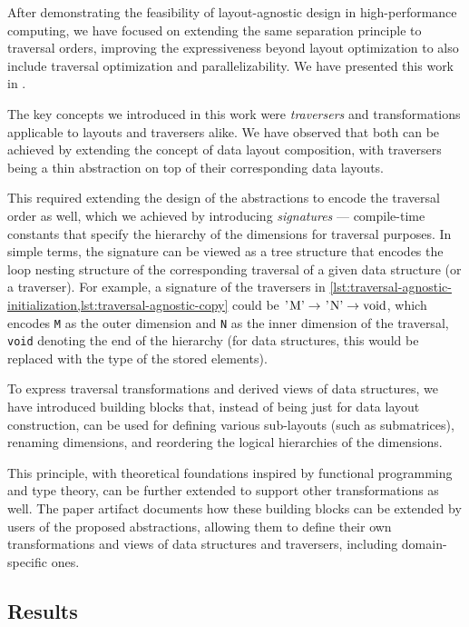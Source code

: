 After demonstrating the feasibility of layout-agnostic design in high-performance computing, we have focused on extending the same separation principle to traversal orders, improving the expressiveness beyond layout optimization to also include traversal optimization and parallelizability. We have presented this work in .

The key concepts we introduced in this work were \emph{traversers} and transformations applicable to layouts and traversers alike. We have observed that both can be achieved by extending the concept of data layout composition, with traversers being a thin abstraction on top of their corresponding data layouts.

This required extending the design of the abstractions to encode the traversal order as well, which we achieved by introducing \emph{signatures} --- compile-time constants that specify the hierarchy of the dimensions for traversal purposes. In simple terms, the signature can be viewed as a tree structure that encodes the loop nesting structure of the corresponding traversal of a given data structure (or a traverser). For example, a signature of the traversers in \cref{lst:traversal-agnostic-initialization,lst:traversal-agnostic-copy} could be $\text{\lstinline{'M'}} \to \text{\lstinline{'N'}} \to \text{\lstinline{void}}$, which encodes \lstinline{M} as the outer dimension and \lstinline{N} as the inner dimension of the traversal, \lstinline{void} denoting the end of the hierarchy (for data structures, this would be replaced with the type of the stored elements).

To express traversal transformations and derived views of data structures, we have introduced building blocks that, instead of being just for data layout construction, can be used for defining various sub-layouts (such as submatrices), renaming dimensions, and reordering the logical hierarchies of the dimensions.

This principle, with theoretical foundations inspired by functional programming and type theory, can be further extended to support other transformations as well. The paper artifact documents how these building blocks can be extended by users of the proposed abstractions, allowing them to define their own transformations and views of data structures and traversers, including domain-specific ones.


\subsection{Results}\label{sec:traversal-agnostic-results}

